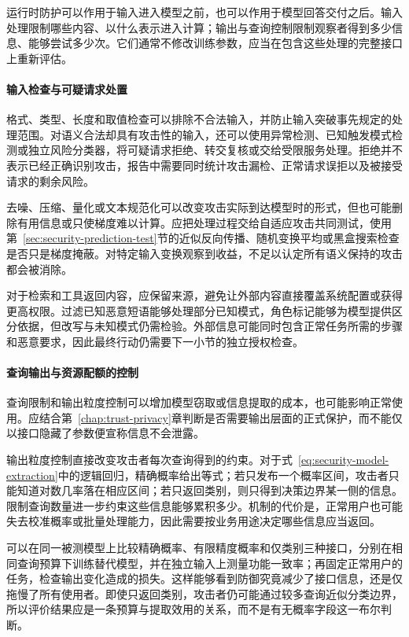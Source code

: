 运行时防护可以作用于输入进入模型之前，也可以作用于模型回答交付之后。输入处理限制哪些内容、以什么表示进入计算；输出与查询控制限制观察者得到多少信息、能够尝试多少次。它们通常不修改训练参数，应当在包含这些处理的完整接口上重新评估。

\paragraph{输入检查与可疑请求处置}

格式、类型、长度和取值检查可以排除不合法输入，并防止输入突破事先规定的处理范围。对语义合法却具有攻击性的输入，还可以使用异常检测、已知触发模式检测或独立风险分类器，将可疑请求拒绝、转交复核或交给受限服务处理。拒绝并不表示已经正确识别攻击，报告中需要同时统计攻击漏检、正常请求误拒以及被接受请求的剩余风险。

去噪、压缩、量化或文本规范化可以改变攻击实际到达模型时的形式，但也可能删除有用信息或只使梯度难以计算。应把处理过程交给自适应攻击共同测试，使用第~\ref{sec:security-prediction-test}节的近似反向传播、随机变换平均或黑盒搜索检查是否只是梯度掩蔽。对特定输入变换观察到收益，不足以认定所有语义保持的攻击都会被消除。

对于检索和工具返回内容，应保留来源，避免让外部内容直接覆盖系统配置或获得更高权限。过滤已知恶意短语能够处理部分已知模式，角色标记能够为模型提供区分依据，但改写与未知模式仍需检验。外部信息可能同时包含正常任务所需的步骤和恶意要求，因此最终行动仍需要下一小节的独立授权检查。

\paragraph{查询输出与资源配额的控制}

查询限制和输出粒度控制可以增加模型窃取或信息提取的成本，也可能影响正常使用。应结合第~\ref{chap:trust-privacy}章判断是否需要输出层面的正式保护，而不能仅以接口隐藏了参数便宣称信息不会泄露。

输出粒度控制直接改变攻击者每次查询得到的约束。对于式~\eqref{eq:security-model-extraction}中的逻辑回归，精确概率给出等式；若只发布一个概率区间，攻击者只能知道对数几率落在相应区间；若只返回类别，则只得到决策边界某一侧的信息。限制查询数量进一步约束这些信息能够累积多少。机制的代价是，正常用户也可能失去校准概率或批量处理能力，因此需要按业务用途决定哪些信息应当返回。

可以在同一被测模型上比较精确概率、有限精度概率和仅类别三种接口，分别在相同查询预算下训练替代模型，并在独立输入上测量功能一致率；再固定正常用户的任务，检查输出变化造成的损失。这样能够看到防御究竟减少了接口信息，还是仅拖慢了所有使用者。即使只返回类别，攻击者仍可能通过较多查询近似分类边界，所以评价结果应是一条预算与提取效用的关系，而不是有无概率字段这一布尔判断。


